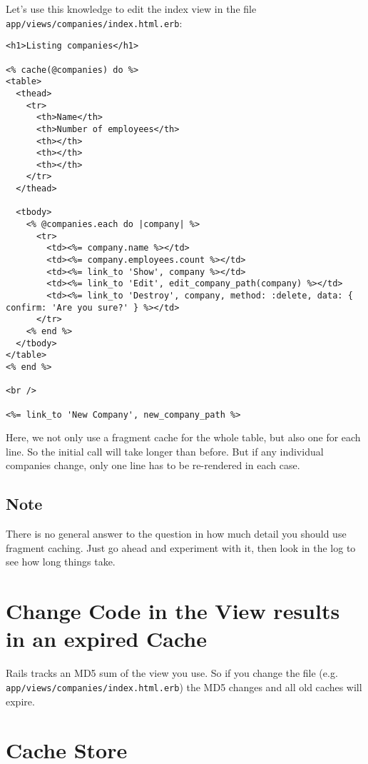 \documentclass[a4paper]{book}
\newcounter{tab}[chapter]
\begin{document}
Let's use this knowledge to edit the index view in the file \texttt{app/views/companies/index.html.erb}:

\begin{shaded}\begin{verbatim}
<h1>Listing companies</h1>

<% cache(@companies) do %>
<table>
  <thead>
    <tr>
      <th>Name</th>
      <th>Number of employees</th>
      <th></th>
      <th></th>
      <th></th>
    </tr>
  </thead>

  <tbody>
    <% @companies.each do |company| %>
      <tr>
        <td><%= company.name %></td>
        <td><%= company.employees.count %></td>
        <td><%= link_to 'Show', company %></td>
        <td><%= link_to 'Edit', edit_company_path(company) %></td>
        <td><%= link_to 'Destroy', company, method: :delete, data: { confirm: 'Are you sure?' } %></td>
      </tr>
    <% end %>
  </tbody>
</table>
<% end %>

<br />

<%= link_to 'New Company', new_company_path %>
\end{verbatim}\end{shaded}

Here, we not only use a fragment cache for the whole table, but also one for each line. So the initial call will take longer than before. But if any individual companies change, only one line has to be re-rendered in each case.

\subsection{Note}\label{note-54}

There is no general answer to the question in how much detail you should use fragment caching. Just go ahead and experiment with it, then look in the log to see how long things take.

\section{Change Code in the View results in an expired Cache}\label{change-code-in-the-view-results-in-an-expired-cache}

Rails tracks an MD5 sum of the view you use. So if you change the file (e.g. \texttt{app/views/companies/index.html.erb}) the MD5 changes and all old caches will expire.

\section{Cache Store}\label{cache-store}
\end{document}
